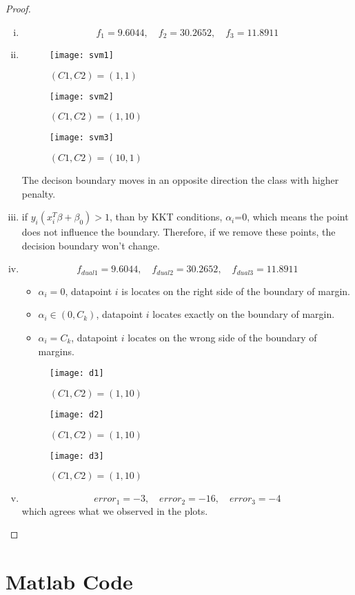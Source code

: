 \documentclass{article}
\theoremstyle{remark}
\theoremstyle{definition}
\begin{document}
\begin{proof}
\begin{enumerate}[(i)]
    \item 
    \[f_1= 9.6044, \quad f_2 = 30.2652,\quad f_3 = 11.8911\]
    \item         \begin{figure}[H]
  \centering
\texttt{[image: svm1]}
  \caption[]
   { $(C1,C2)=(1,1)$}
\end{figure}

     \begin{figure}[H]
  \centering
\texttt{[image: svm2]}
  \caption[]
   { $(C1,C2)=(1,10)$}
\end{figure}

     \begin{figure}[H]
  \centering
\texttt{[image: svm3]}
  \caption[]
   { $(C1,C2)=(10,1)$}
\end{figure}
The decison boundary moves in an opposite direction the class with higher penalty. 
\item if $y_i(x_i^T\beta+\beta_0)>1$, than by KKT conditions, $\alpha_i$=0, which means the point does not influence the boundary. Therefore, if we remove these points, the decision boundary won't change.
\item \[f_{dual1}=9.6044,\quad f_{dual2}=30.2652,\quad f_{dual3}=11.8911\]
   \begin{itemize}
    \item $\alpha_i=0$, datapoint $i$ is locates on the right side of the boundary of margin.
    \item $\alpha_i\in (0,C_k)$,  datapoint $i$ locates exactly on the boundary of margin.
    \item $\alpha_i =C_k$, datapoint $i$ locates on the wrong side of the boundary of margins.
   \end{itemize}
 \begin{figure}[H]
  \centering
\texttt{[image: d1]}
  \caption[]
   { $(C1,C2)=(1,10)$}
\end{figure}

 \begin{figure}[H]
  \centering
\texttt{[image: d2]}
  \caption[]
   { $(C1,C2)=(1,10)$}
\end{figure}
 \begin{figure}[H]
  \centering
\texttt{[image: d3]}
  \caption[]
   { $(C1,C2)=(1,10)$}
\end{figure}
\item \[error_1= -3,\quad error_2= -16, \quad error_3 = -4\]
which agrees what we observed in the plots.
\end{enumerate}
\end{proof}

\section*{Matlab Code}










\end{document}

